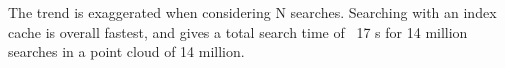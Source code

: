 The trend is exaggerated when considering N searches. Searching with an index cache is overall fastest, and gives a total search time of ~17 s for 14 million searches in a point cloud of 14 million.











% 



